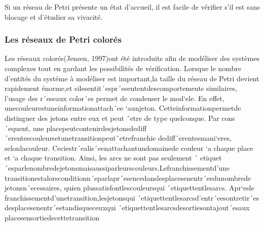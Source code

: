 Si un réseau de Petri présente un état d’accueil, il est facile de vérifier s’il est sans blocage et d'étudier sa vivacité.


\subsubsection{Les réseaux de Petri colorés}
Les réseaux colorés(Jensen, 1997)ont été introduits afin de modéliser des systèmes complexes tout en gardant les possibilités de vérification. Lorsque le nombre d'entités du systéme à modéliser est important,la taille du réseau de Petri devient rapidement énorme,et silesentit´espr´esententdescomportements similaires, l’usage des r´eseaux color´es permet de condenser le mod`ele. En effet, unecouleurestuneinformationattach´ee `aunjeton. Cetteinformationpermetde distinguer des jetons entre eux et peut ˆetre de type quelconque. Par cons´equent, une placepeutcontenirdesjetonsdediff´erentescouleursetunetransitionpeutˆetrefranchie dediff´erentesmani`eres, selonlacouleur. Ceciestr´ealis´eenattachantundomainede couleur `a chaque place et `a chaque transition. Ainsi, les arcs ne sont pas seulement ´ etiquet´esparlenombredejetonsmaisaussiparleurscouleurs.Lefranchissementd’une transitionestalorsconditionn´eparlapr´esencedanslesplacesenentr´eedunombrede jetonsn´ecessaires, quien plussatisfontlescouleursqui ´etiquettentlesarcs. Apr`esle franchissementd’unetransition,lesjetonsqui ´etiquettentlesarcsd’entr´eesontretir´es desplacesenentr´eetandisqueceuxqui ´etiquettentlesarcsdesortiesontajout´esaux placesensortiedecettetransition






















